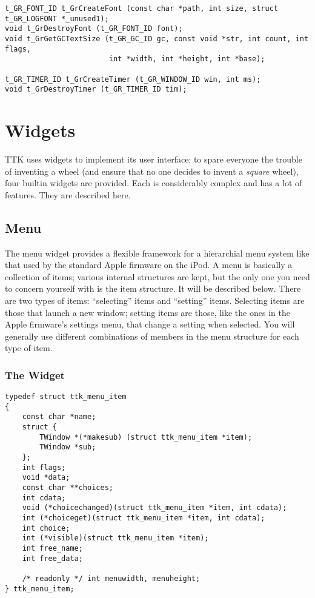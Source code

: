 \documentclass[12pt,letterpaper]{report}
\begin{document}
{\begin{verbatim}
t_GR_FONT_ID t_GrCreateFont (const char *path, int size, struct t_GR_LOGFONT *_unused1);
void t_GrDestroyFont (t_GR_FONT_ID font);
void t_GrGetGCTextSize (t_GR_GC_ID gc, const void *str, int count, int flags,
                        int *width, int *height, int *base);

t_GR_TIMER_ID t_GrCreateTimer (t_GR_WINDOW_ID win, int ms);
void t_GrDestroyTimer (t_GR_TIMER_ID tim);
\end{verbatim}
}

\chapter{Widgets}
TTK uses widgets to implement its user interface; to spare everyone the trouble of inventing
a wheel (and ensure that no one decides to invent a \emph{square} wheel), four builtin widgets
are provided. Each is considerably complex and has a lot of features. They are described here.

\section{Menu}


The menu widget provides a flexible framework for a hierarchial menu system like that used by
the standard Apple firmware on the iPod. A menu is basically a collection of items; various
internal structures are kept, but the only one you need to concern yourself with is the
item structure. It will be described below. There are two types of items: ``selecting'' items
and ``setting'' items. Selecting items are those that launch a new window; setting items
are those, like the ones in the Apple firmware's settings menu, that change a setting
when selected. You will generally use different combinations of members in the menu structure
for each type of item.

\subsection{The Widget}

\begin{verbatim}
typedef struct ttk_menu_item 
{
    const char *name;
    struct {
        TWindow *(*makesub) (struct ttk_menu_item *item);
        TWindow *sub;
    };
    int flags;
    void *data;
    const char **choices;
    int cdata;
    void (*choicechanged)(struct ttk_menu_item *item, int cdata);
    int (*choiceget)(struct ttk_menu_item *item, int cdata);
    int choice;
    int (*visible)(struct ttk_menu_item *item);
    int free_name;
    int free_data;

    /* readonly */ int menuwidth, menuheight;
} ttk_menu_item;
\end{verbatim}
\end{document}
